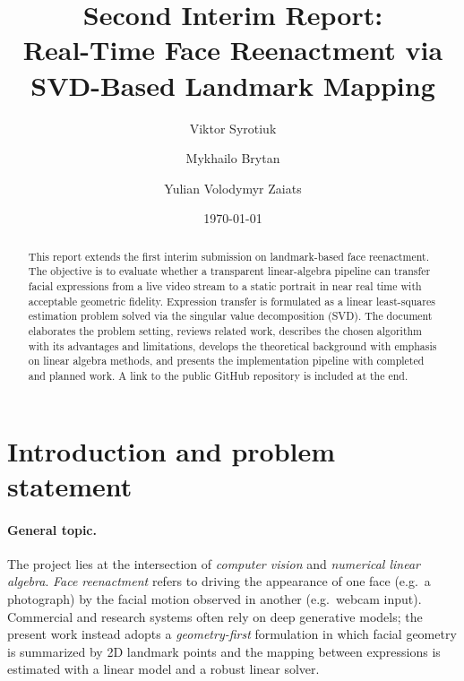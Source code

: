 \documentclass[11pt,a4paper]{article}
\title{Second Interim Report:\\[0.3em]
\large Real-Time Face Reenactment via SVD-Based Landmark Mapping}
\author{Viktor Syrotiuk \and Mykhailo Brytan \and Yulian Volodymyr Zaiats}
\date{\today}
\begin{document}
\maketitle

\begin{abstract}
This report extends the first interim submission on landmark-based face reenactment.
The objective is to evaluate whether a transparent linear-algebra pipeline can
transfer facial expressions from a live video stream to a static portrait in near
real time with acceptable geometric fidelity. Expression transfer is formulated as
a linear least-squares estimation problem solved via the singular value decomposition
(SVD). The document elaborates the problem setting, reviews related work, describes
the chosen algorithm with its advantages and limitations, develops the theoretical
background with emphasis on linear algebra methods, and presents the implementation
pipeline with completed and planned work. A link to the public GitHub repository is
included at the end.
\end{abstract}

\section{Introduction and problem statement}
\label{sec:intro}

\paragraph{General topic.}
The project lies at the intersection of \emph{computer vision} and \emph{numerical
linear algebra}. \emph{Face reenactment} refers to driving the appearance of one
face (e.g.\ a photograph) by the facial motion observed in another (e.g.\ webcam
input). Commercial and research systems often rely on deep generative models; the
present work instead adopts a \emph{geometry-first} formulation in which facial
geometry is summarized by 2D landmark points and the mapping between expressions is
estimated with a linear model and a robust linear solver.
\end{document}
